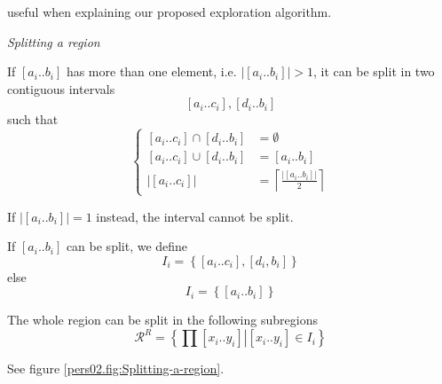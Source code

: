 useful when explaining our proposed exploration algorithm.
\begin{defn}
\emph{\label{pers02.def:Splitting-a-region}Splitting a region}

If $\left[a_{i}..b_{i}\right]$ has more than one element, i.e. $\left|\left[a_{i}..b_{i}\right]\right|>1$,
it can be split in two contiguous intervals
\[
\left[a_{i}..c_{i}\right],\left[d_{i}..b_{i}\right]
\]
 such that
\[
\begin{cases}
\left[a_{i}..c_{i}\right]\cap\left[d_{i}..b_{i}\right] & =\emptyset\\
\left[a_{i}..c_{i}\right]\cup\left[d_{i}..b_{i}\right] & =\left[a_{i}..b_{i}\right]\\
\left|\left[a_{i}..c_{i}\right]\right| & =\left\lceil \frac{\left|\left[a_{i}..b_{i}\right]\right|}{2}\right\rceil 
\end{cases}
\]


If $\left|\left[a_{i}..b_{i}\right]\right|=1$ instead, the interval
cannot be split. 

If $\left[a_{i}..b_{i}\right]$ can be split, we define
\[
I_{i}=\left\{ \left[a_{i}..c_{i}\right],\left[d_{i},b_{i}\right]\right\} 
\]
 else
\[
I_{i}=\left\{ \left[a_{i}..b_{i}\right]\right\} 
\]


The whole region can be split in the following subregions
\[
\mathcal{R}^{R}=\left\{ \left.\prod\left[x_{i}..y_{i}\right]\right|\left[x_{i}..y_{i}\right]\in I_{i}\right\} 
\]


See figure \ref{pers02.fig:Splitting-a-region}.


\end{defn}
